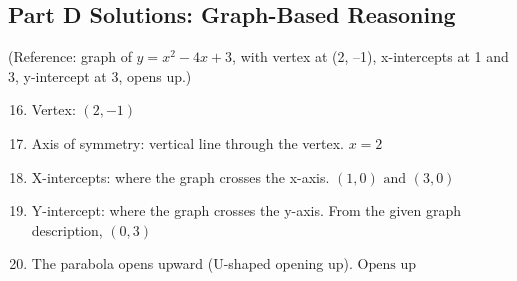 \documentclass[12pt]{article}
\begin{document}
\subsection*{Part D Solutions: Graph-Based Reasoning}
(Reference: graph of \(y = x^2 - 4x + 3\), with vertex at (2, –1), x-intercepts at 1 and 3, y-intercept at 3, opens up.)

\begin{enumerate}
  \setcounter{enumi}{15}
  \item Vertex: \(\boxed{(2, -1)}\)

  \item Axis of symmetry: vertical line through the vertex.  
  \(\boxed{x = 2}\)

  \item X-intercepts: where the graph crosses the x-axis.  
  \(\boxed{(1, 0) \text{ and } (3, 0)}\)

  \item Y-intercept: where the graph crosses the y-axis.  
  From the given graph description, \(\boxed{(0, 3)}\)

  \item The parabola opens upward (U-shaped opening up).  
  \(\boxed{\text{Opens up}}\)
\end{enumerate}
\end{document}
